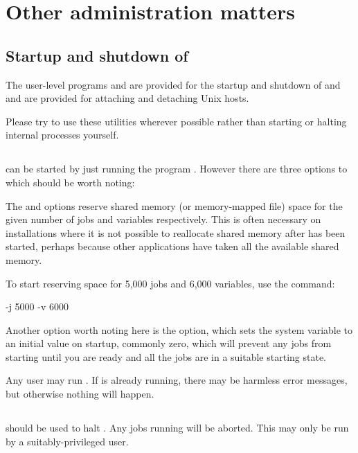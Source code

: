 \chapter{Other administration matters}
\label{chp:other-administration-matters}
\section{Startup and shutdown of \ProductName{}}
The user-level programs \PrBtstart{} and \PrBtquit{} are provided for the startup and shutdown
of \ProductName{} and \PrBtconn{} and \PrBtdisconn{} are provided for attaching and
detaching Unix hosts.

Please try to use these utilities wherever possible rather than starting or halting internal processes yourself.

\section{\BtstartName}
\ProductName{} can be started by just running the program \PrBtstart{}. However there are three options to
\PrBtstart{} which should be worth noting:

The  and 
options reserve shared memory (or memory-mapped file) space for the given number of jobs and variables respectively. This is often
necessary on installations where it is not possible to reallocate shared memory after \ProductName{} has been started, perhaps because other applications have taken all the available shared memory.

To start \ProductName{} reserving space for 5,000 jobs and 6,000 variables, use the command:

\begin{expara}

\BtstartName{} -j 5000 -v 6000

\end{expara}

Another option worth noting here is the  option, which sets the  system variable to
an initial value on startup, commonly zero, which will prevent any jobs from starting until you are ready and all the jobs are in a suitable starting state.

Any user may run \PrBtstart{}. If \ProductName{} is already running, there may be harmless error messages, but otherwise nothing
will happen.

\section{\BtquitName}
\PrBtquit{} should be used to halt \ProductName{}. Any jobs running will be aborted. This may only be run by a suitably-privileged
user.

